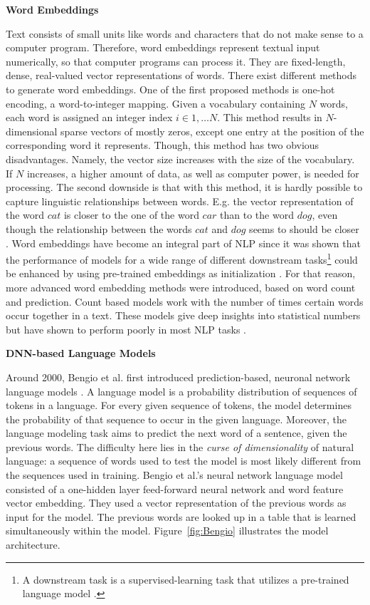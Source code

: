  
\textbf{Word Embeddings}
    \label{sec:word_embeddings}

Text consists of small units like words and characters that do not make sense to a computer program. Therefore, word embeddings represent textual input numerically, so that computer programs can process it. They are fixed-length, dense, real-valued vector representations of words.
There exist different methods to generate word embeddings. One of the first proposed methods is one-hot encoding, a word-to-integer mapping. Given a vocabulary containing $N$ words, each word is assigned an integer index $i \in {1, \dots N}$. 
This method results in $N$-dimensional sparse vectors of mostly zeros, except one entry at the position of the corresponding word it represents. Though, this method has two obvious disadvantages. Namely, the vector size increases with the size of the vocabulary. If $N$ increases, a higher amount of data, as well as computer power, is needed for processing. The second downside is that with this method, it is hardly possible to capture linguistic relationships between words. E.g. the vector representation of the word $cat$ is closer to the one of the word $car$ than to the word $dog$, even though the relationship between the words $cat$ and $dog$ seems to should be closer \cite{rodriguez2018beyond}.
Word embeddings have become an integral part of NLP since it was shown that the performance of models for a wide range of different downstream tasks\footnote{A downstream task is a supervised-learning task that utilizes a pre-trained language model \cite{alammar2018illustrated}.} could be enhanced by using pre-trained embeddings as initialization \cite{mikolov2013efficient, pennington2014glove}. 
For that reason, more advanced word embedding methods were introduced, based on word count and prediction. Count based models work with the number of times certain words occur together in a text. These models give deep insights into statistical numbers but have shown to perform poorly in most NLP tasks \cite{neubig2016generalizing}.

 
\textbf{DNN-based Language Models}
    \label{sec:DNN-based_Language_models}



Around 2000, Bengio et al. first introduced prediction-based, neuronal network language models \cite{bengio2003neural}. A language model is a probability distribution of sequences of tokens in a language. For every given sequence of tokens, the model determines the probability of that sequence to occur in the given language. Moreover, the language modeling task aims to predict the next word of a sentence, given the previous words. The difficulty here lies in the \textit{curse of dimensionality} of natural language: a sequence of words used to test the model is most likely different from the sequences used in training.  Bengio et al.'s neural network language model consisted of a one-hidden layer feed-forward neural network and word feature vector embedding.
They used a vector representation of the previous words as input for the model. The previous words are looked up in a table that is learned simultaneously within the model. 
Figure~\ref{fig:Bengio} illustrates the model architecture.

